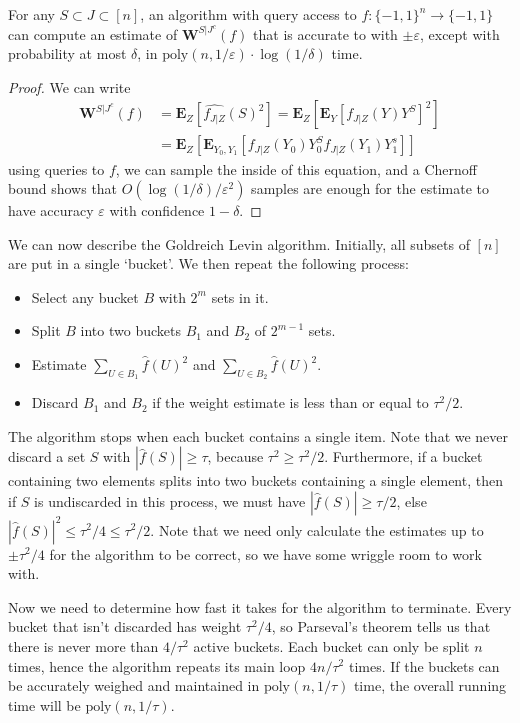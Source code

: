 \begin{theorem}
    For any $S \subset J \subset [n]$, an algorithm with query access to $f: \{ -1, 1 \}^n \to \{ -1, 1 \}$ can compute an estimate of $\mathbf{W}^{S|J^c}(f)$ that is accurate to with $\pm \varepsilon$, except with probability at most $\delta$, in $\text{poly}(n,1/\varepsilon) \cdot \log(1/\delta)$ time.
\end{theorem}
\begin{proof}
    We can write
    \begin{align*}
        \mathbf{W}^{S|J^c}(f) &= \mathbf{E}_Z[\widehat{f_{J|Z}}(S)^2] = \mathbf{E}_Z \left[ \mathbf{E}_Y \left[ f_{J|Z}(Y) Y^S \right]^2 \right]\\
        &= \mathbf{E}_Z \left[ \mathbf{E}_{Y_0,Y_1} \left[ f_{J|Z}(Y_0) Y_0^S f_{J|Z}(Y_1) Y_1^s \right] \right]
    \end{align*}
    using queries to $f$, we can sample the inside of this equation, and a Chernoff bound shows that $O(\log(1/\delta)/\varepsilon^2)$ samples are enough for the estimate to have accuracy $\varepsilon$ with confidence $1-\delta$.
\end{proof}

We can now describe the Goldreich Levin algorithm. Initially, all subsets of $[n]$ are put in a single `bucket'. We then repeat the following process:
%
\begin{itemize}
    \item Select any bucket $B$ with $2^m$ sets in it.
    \item Split $B$ into two buckets $B_1$ and $B_2$ of $2^{m-1}$ sets.
    \item Estimate $\sum_{U \in B_1} \widehat{f}(U)^2$ and $\sum_{U \in B_2} \widehat{f}(U)^2$.
    \item Discard $B_1$ and $B_2$ if the weight estimate is less than or equal to $\tau^2/2$.
\end{itemize}
%
The algorithm stops when each bucket contains a single item. Note that we never discard a set $S$ with $|\widehat{f}(S)| \geq \tau$, because $\tau^2 \geq \tau^2/2$. Furthermore, if a bucket containing two elements splits into two buckets containing a single element, then if $S$ is undiscarded in this process, we must have $|\widehat{f}(S)| \geq \tau/2$, else $|\widehat{f}(S)|^2 \leq \tau^2/4 \leq \tau^2/2$. Note that we need only calculate the estimates up to $\pm \tau^2/4$ for the algorithm to be correct, so we have some wriggle room to work with.

Now we need to determine how fast it takes for the algorithm to terminate. Every bucket that isn't discarded has weight $\tau^2/4$, so Parseval's theorem tells us that there is never more than $4/\tau^2$ active buckets. Each bucket can only be split $n$ times, hence the algorithm repeats its main loop $4n/\tau^2$ times. If the buckets can be accurately weighed and maintained in $\text{poly}(n,1/\tau)$ time, the overall running time will be $\text{poly}(n,1/\tau)$.

